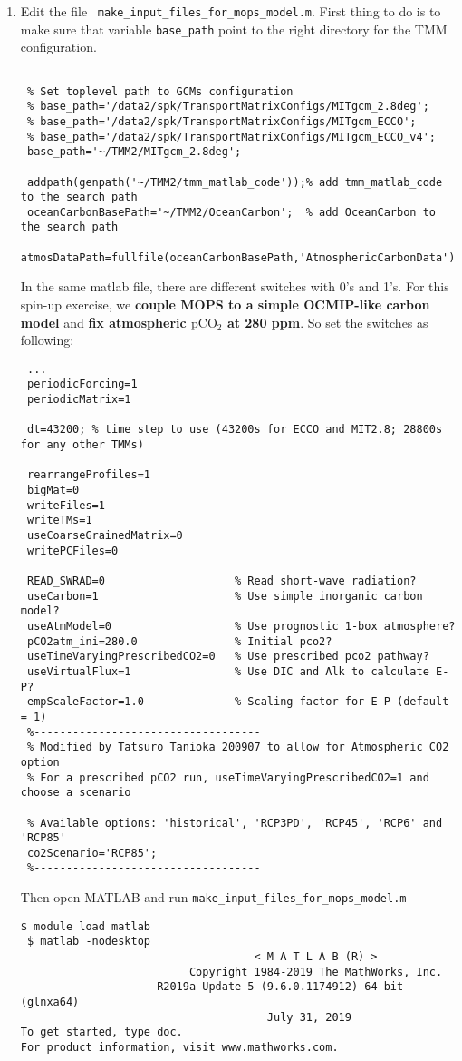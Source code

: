 \documentclass[a4paper]{article}
\def\noin{\noindent }
\begin{document}
\begin{enumerate}
\item Edit the file \ \verb/make_input_files_for_mops_model.m/. First thing to do is to make sure that variable \verb/base_path/ point to the right directory for the TMM configuration.
\lstset{language=matlab} 
\begin{lstlisting}[frame=single,basicstyle=\scriptsize,commentstyle=\color{blue}]
 % make_input_files_for_mops_model.m
 
 % Set toplevel path to GCMs configuration
 % base_path='/data2/spk/TransportMatrixConfigs/MITgcm_2.8deg';
 % base_path='/data2/spk/TransportMatrixConfigs/MITgcm_ECCO';
 % base_path='/data2/spk/TransportMatrixConfigs/MITgcm_ECCO_v4';
 base_path='~/TMM2/MITgcm_2.8deg';
 
 addpath(genpath('~/TMM2/tmm_matlab_code'));% add tmm_matlab_code to the search path
 oceanCarbonBasePath='~/TMM2/OceanCarbon';  % add OceanCarbon to the search path
 atmosDataPath=fullfile(oceanCarbonBasePath,'AtmosphericCarbonData');
\end{lstlisting}
\noin In the same matlab file, there are different switches with 0's and 1's. For this spin-up exercise, we \textbf{couple MOPS to a simple OCMIP-like carbon model} and \textbf{fix atmospheric $\mathrm{pCO_{2}}$ at 280 ppm}. So set the switches as following:
\begin{lstlisting}[frame=single,basicstyle=\scriptsize,commentstyle=\color{blue}]
 % make_input_files_for_mops_model.m
 ...
 periodicForcing=1 
 periodicMatrix=1
 
 dt=43200; % time step to use (43200s for ECCO and MIT2.8; 28800s for any other TMMs)
 
 rearrangeProfiles=1
 bigMat=0
 writeFiles=1
 writeTMs=1
 useCoarseGrainedMatrix=0
 writePCFiles=0
 
 READ_SWRAD=0                    % Read short-wave radiation?
 useCarbon=1                     % Use simple inorganic carbon model?
 useAtmModel=0                   % Use prognostic 1-box atmosphere?
 pCO2atm_ini=280.0               % Initial pco2?
 useTimeVaryingPrescribedCO2=0   % Use prescribed pco2 pathway?
 useVirtualFlux=1                % Use DIC and Alk to calculate E-P?
 empScaleFactor=1.0              % Scaling factor for E-P (default = 1)
 %-----------------------------------
 % Modified by Tatsuro Tanioka 200907 to allow for Atmospheric CO2 option
 % For a prescribed pCO2 run, useTimeVaryingPrescribedCO2=1 and choose a scenario
 
 % Available options: 'historical', 'RCP3PD', 'RCP45', 'RCP6' and 'RCP85'
 co2Scenario='RCP85';
 %-----------------------------------
\end{lstlisting}
\noin Then open MATLAB and run \verb/make_input_files_for_mops_model.m/
\begin{lstlisting}[style=DOS]
 $ module load matlab
 $ matlab -nodesktop
                                    < M A T L A B (R) >
                          Copyright 1984-2019 The MathWorks, Inc.
                     R2019a Update 5 (9.6.0.1174912) 64-bit (glnxa64)
                                      July 31, 2019
To get started, type doc.
For product information, visit www.mathworks.com.


\end{lstlisting}
\end{enumerate}
\end{document}
